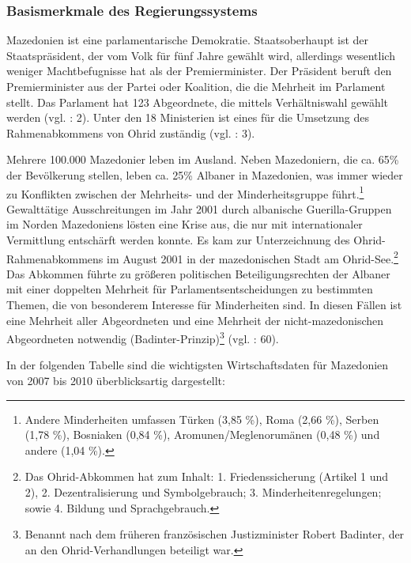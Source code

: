 \subsubsection{Basismerkmale des Regierungssystems}

Mazedonien ist eine parlamentarische Demokratie. Staatsoberhaupt ist der Staatspräsident, der vom Volk für fünf Jahre gewählt wird, allerdings wesentlich weniger Machtbefugnisse hat als der Premierminister. Der Präsident beruft den Premierminister aus der Partei oder Koalition, die die Mehrheit im Parlament stellt. Das Parlament hat 123 Abgeordnete, die mittels Verhältniswahl gewählt werden (vgl. \cite{osceodihr11}: 2). Unter den 18 Ministerien ist eines für die Umsetzung des Rahmenabkommens von Ohrid zuständig (vgl. \cite{markic}: 3).\par
Mehrere 100.000 Mazedonier leben im Ausland. Neben Mazedoniern, die ca. 65\% der Bevölkerung stellen, leben ca. 25\% Albaner in Mazedonien, was immer wieder zu Konflikten zwischen der Mehrheits- und der Minderheitsgruppe führt.\footnote{Andere Minderheiten umfassen Türken (3,85 \%), Roma (2,66 \%), Serben (1,78 \%), Bosniaken (0,84 \%), Aromunen/Meglenorumänen (0,48 \%) und andere (1,04 \%).} Gewalttätige Ausschreitungen im Jahr 2001 durch albanische Guerilla-Gruppen im Norden Mazedoniens lösten eine Krise aus, die nur mit internationaler Vermittlung entschärft werden konnte. Es kam zur Unterzeichnung des Ohrid-Rahmenabkommens im August 2001 in der mazedonischen Stadt am Ohrid-See.\footnote{Das Ohrid-Abkommen hat zum Inhalt: 1. Friedenssicherung (Artikel 1 und 2), 2. Dezentralisierung und Symbolgebrauch; 3. Minderheitenregelungen; sowie 4. Bildung und Sprachgebrauch.} Das Abkommen führte zu größeren politischen Beteiligungsrechten der Albaner mit einer doppelten Mehrheit für Parlamentsentscheidungen zu bestimmten Themen, die von besonderem Interesse für Minderheiten sind. In diesen Fällen ist eine Mehrheit aller Abgeordneten und eine Mehrheit der nicht-mazedonischen Abgeordneten notwendig (Badinter-Prinzip)\footnote{Benannt nach dem früheren französischen Justizminister Robert Badinter, der an den Ohrid-Verhandlungen beteiligt war.} (vgl. \cite{szpala}: 60).\par
In der folgenden Tabelle sind die wichtigsten Wirtschaftsdaten für Mazedonien von 2007 bis 2010 überblicksartig dargestellt:
